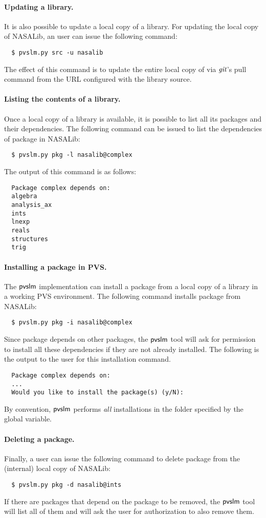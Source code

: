 \paragraph{Updating a library.} It is also possible to update a local
copy of a library. For updating the local copy of NASALib, an user can
issue the following command:
%
{\small\begin{verbatim}
  $ pvslm.py src -u nasalib
\end{verbatim}}
%
The effect of this command is to update the entire local copy of
 via $\textit{git}$'s pull command from the URL configured with
the library source.

\paragraph{Listing the contents of a library.} Once a local
copy of a library is available, it is possible to list all its
packages and their dependencies. The following command can be issued
to list the dependencies of package  in NASALib:
%
{\small\begin{verbatim}
  $ pvslm.py pkg -l nasalib@complex
\end{verbatim}}
%
The output of this command is as follows:
%
{\small\begin{verbatim}
  Package complex depends on:
  algebra
  analysis_ax
  ints
  lnexp
  reals
  structures
  trig
\end{verbatim}}

\paragraph{Installing a package in PVS.} The $\textsf{pvslm}$ implementation
can install a package from a local copy of a library in a working PVS
environment. The following command installs package  from
NASALib:
%
{\small\begin{verbatim}
  $ pvslm.py pkg -i nasalib@complex
\end{verbatim}}
%
Since package  depends on other packages, the $\textsf{pvslm}$
tool will ask for permission to install all these dependencies if they
are not already installed. The following is the output to the user for
this installation command.
%
{\small\begin{verbatim}
  Package complex depends on:
  ...
  Would you like to install the package(s) (y/N):
\end{verbatim}}
%
By convention, $\textsf{pvslm}$ performs {\em all} installations in the folder
specified by the  global variable.

\paragraph{Deleting a package.} Finally, a user can issue the following
command to delete package  from the (internal) local copy of
NASALib:
%
{\small\begin{verbatim}
  $ pvslm.py pkg -d nasalib@ints
\end{verbatim}}
%
If there are packages that depend on the package to be removed, the
$\textsf{pvslm}$ tool will list all of them and will ask the user for
authorization to also remove them.
